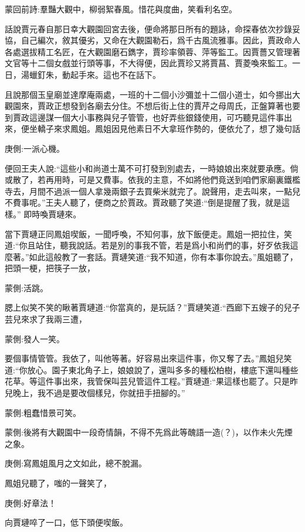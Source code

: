 
\begin{parag}
    \begin{note}蒙回前詩:羣豔大觀中，柳弱絮春風。惜花與度曲，笑看利名空。\end{note}
\end{parag}


\begin{parag}
    話說賈元春自那日幸大觀園回宮去後，便命將那日所有的題詠，命探春依次抄錄妥協，自己編次，敘其優劣，又命在大觀園勒石，爲千古風流雅事。因此，賈政命人各處選拔精工名匠，在大觀園磨石鐫字，賈珍率領蓉、萍等監工。因賈薔又管理著文官等十二個女戲並行頭等事，不大得便，因此賈珍又將賈菖、賈菱喚來監工。一日，湯蠟釘朱，動起手來。這也不在話下。
\end{parag}


\begin{parag}
    且說那個玉皇廟並達摩庵兩處，一班的十二個小沙彌並十二個小道士，如今挪出大觀園來，賈政正想發到各廟去分住。不想后街上住的賈芹之母周氏，正盤算著也要到賈政這邊謀一個大小事務與兒子管管，也好弄些銀錢使用，可巧聽見這件事出來，便坐轎子來求鳳姐。鳳姐因見他素日不大拿班作勢的，便依允了，想了幾句話\begin{note}庚側:一派心機。\end{note}便回王夫人說:“這些小和尚道士萬不可打發到別處去，一時娘娘出來就要承應。倘或散了，若再用時，可是又費事。依我的主意，不如將他們竟送到咱們家廟裏鐵檻寺去，月間不過派一個人拿幾兩銀子去買柴米就完了。說聲用，走去叫來，一點兒不費事呢。”王夫人聽了，便商之於賈政。賈政聽了笑道:“倒是提醒了我，就是這樣。” 即時喚賈璉來。
\end{parag}


\begin{parag}
    當下賈璉正同鳳姐喫飯，一聞呼喚，不知何事，放下飯便走。鳳姐一把拉住，笑道:“你且站住，聽我說話。若是別的事我不管，若是爲小和尚們的事，好歹依我這麼著。”如此這般教了一套話。賈璉笑道:“我不知道，你有本事你說去。”風姐聽了，把頭一梗，把筷子一放，\begin{note}蒙側:活跳。\end{note}腮上似笑不笑的瞅著賈璉道:“你當真的，是玩話？”賈璉笑道:“西廊下五嫂子的兒子芸兒來求了我兩三遭，\begin{note}蒙側:發人一笑。\end{note}要個事情管管。我依了，叫他等著。好容易出來這件事，你又奪了去。”鳳姐兒笑道:“你放心。園子東北角子上，娘娘說了，還叫多多的種松柏樹，樓底下還叫種些花草。等這件事出來，我管保叫芸兒管這件工程。”賈璉道:“果這樣也罷了。只是昨兒晚上，我不過是要改個樣兒，你就扭手扭腳的。”\begin{note}蒙側:粗蠢惜景可笑。\end{note}\begin{note}蒙側:後將有大觀園中一段奇情韻，不得不先爲此等醜語一造(？)，以作未火先煙之象。\end{note}\begin{note}庚側:寫鳳姐風月之文如此，總不脫漏。\end{note}鳳姐兒聽了，嗤的一聲笑了，\begin{note}庚側:好章法！\end{note}向賈璉啐了一口，低下頭便喫飯。
\end{parag}


